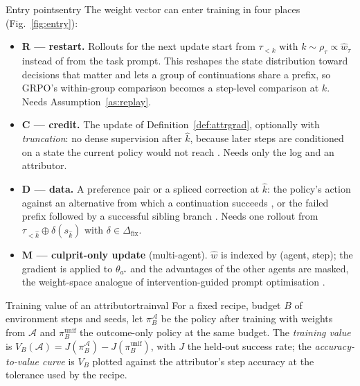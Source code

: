 \begin{definition}{Entry points}{entry}
The weight vector can enter training in four places (Fig.~\ref{fig:entry}):
\begin{itemize}[leftmargin=1.1em]
\item \textbf{R --- restart.} Rollouts for the next update start from $\tau_{<k}$ with $k\sim\rho_\tau\propto\hat w_\tau$ instead of from the task prompt. This reshapes the state distribution toward decisions that matter and lets a group of continuations share a prefix, so GRPO's within-group comparison becomes a step-level comparison at $k$. Needs Assumption~\ref{as:replay}.
\item \textbf{C --- credit.} The update of Definition~\ref{def:attrgrad}, optionally with \emph{truncation}: no dense supervision after $\hat k$, because later steps are conditioned on a state the current policy would not reach \cite{huang2026etro,guo2026pivoarl}. Needs only the log and an attributor.
\item \textbf{D --- data.} A preference pair or a spliced correction at $\hat k$: the policy's action against an alternative from which a continuation succeeds \cite{li2026cso}, or the failed prefix followed by a successful sibling branch \cite{yuan2025agentr}. Needs one rollout from $\tau_{<\hat k}\oplus\delta(s_{\hat k})$ with $\delta\in\Delta_{\mathrm{fix}}$.
\item \textbf{M --- culprit-only update} (multi-agent). $\hat w$ is indexed by (agent, step); the gradient is applied to $\theta_{a^\star}$ and the advantages of the other agents are masked, the weight-space analogue of intervention-guided prompt optimisation \cite{chu2026agentgrad}.
\end{itemize}
\end{definition}

\begin{definition}{Training value of an attributor}{trainval}
For a fixed recipe, budget $B$ of environment steps and seeds, let $\pi^{\mathcal{A}}_B$ be the policy after training with weights from $\mathcal{A}$ and $\pi^{\mathrm{unif}}_B$ the outcome-only policy at the same budget. The \emph{training value} is $V_B(\mathcal{A})=J(\pi^{\mathcal{A}}_B)-J(\pi^{\mathrm{unif}}_B)$, with $J$ the held-out success rate; the \emph{accuracy-to-value curve} is $V_B$ plotted against the attributor's step accuracy at the tolerance used by the recipe.
\end{definition}

